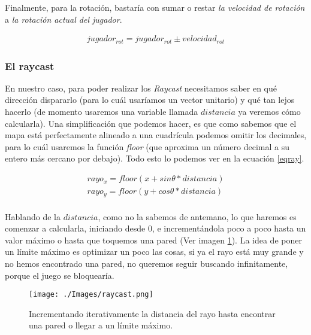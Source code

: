 Finalmente, para la rotación, bastaría con sumar o restar \emph{la velocidad de rotación} a \emph{la rotación actual del jugador}.

\begin{equation}
\begin{aligned}
\label{movforw}
jugador_{rot} = jugador_{rot} \pm velocidad_{rot}
\end{aligned}
\end{equation}





\subsubsection{El raycast}

En nuestro caso, para poder realizar los \emph{Raycast} necesitamos saber en qué dirección dispararlo (para lo cuál usaríamos un vector unitario) y qué tan lejos hacerlo (de momento usaremos una variable llamada $distancia$ ya veremos cómo calcularla). Una simplificación que podemos hacer, es que como sabemos que el mapa está perfectamente alineado a una cuadrícula podemos omitir los decimales, para lo cuál usaremos la función \emph{floor} (que aproxima un número decimal a su entero más cercano por debajo). Todo esto lo podemos ver en la ecuación \ref{eqray}.

\begin{equation}
\begin{aligned}
\label{eqray}
rayo_x = floor(x + sin \theta * distancia)\\
rayo_y = floor(y + cos \theta * distancia)\\
\end{aligned}
\end{equation}

Hablando de la $distancia$, como no la sabemos de antemano, lo que haremos es comenzar a calcularla, iniciando desde 0, e incrementándola poco a poco hasta un valor máximo o hasta que toquemos una pared (Ver imagen \ref{raycastit}). La idea de poner un límite máximo es optimizar un poco las cosas, si ya el rayo está muy grande y no hemos encontrado una pared, no queremos seguir buscando infinitamente, porque el juego se bloquearía.

\begin{figure}[h!]
	\centering
	\texttt{[image: ./Images/raycast.png]}
	\caption{Incrementando iterativamente la distancia del rayo hasta encontrar una pared o llegar a un límite máximo.}
	\label{raycastit}
\end{figure}

